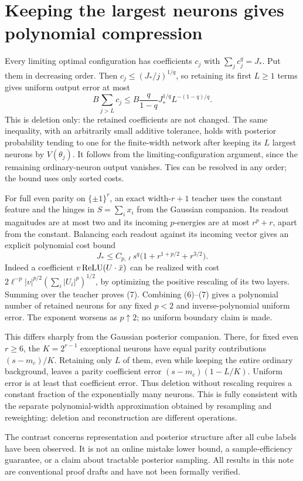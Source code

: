 \documentclass[11pt]{article}
\begin{document}
\section{Keeping the largest neurons gives polynomial compression}
Every limiting optimal configuration has coefficients $c_j$ with
$\sum_j c_j^q=J_*$. Put them in decreasing order. Then
$c_j\le(J_*/j)^{1/q}$, so retaining its first $L\ge1$ terms gives
uniform output error at most
\[
 B\sum_{j>L}c_j
 \le B\frac{q}{1-q}J_*^{1/q}L^{-(1-q)/q}.                \tag{6}
\]
This is deletion only: the retained coefficients are not changed.
The same inequality, with an arbitrarily small additive tolerance,
holds with posterior probability tending to one for the finite-width
network after keeping its $L$ largest neurons by $V(\theta_j)$.
It follows from the limiting-configuration argument, since the remaining
ordinary-neuron output vanishes. Ties can be resolved in any order;
the bound uses only sorted costs.

For full even parity on $\{\pm1\}^r$, an exact width-$r+1$ teacher
uses the constant feature and the hinges in $S=\sum_i x_i$ from the
Gaussian companion. Its readout magnitudes are at most two and its
incoming $p$-energies are at most $r^p+r$, apart from the constant.
Balancing each readout against its incoming vector gives an explicit
polynomial cost bound
\[
 J_*\le C_{p,\ell}s^q\bigl(1+r^{1+p/2}+r^{3/2}\bigr).    \tag{7}
\]
Indeed a coefficient $v\operatorname{ReLU}(U\cdot\bar x)$ can be realized with
cost $2\ell^{-p}|v|^{p/2}(\sum_i|U_i|^p)^{1/2}$, by optimizing the
positive rescaling of its two layers. Summing over the teacher proves
(7). Combining (6)--(7) gives a polynomial number of retained neurons
for any fixed $p<2$ and inverse-polynomial uniform error.
The exponent worsens as $p\uparrow2$; no uniform boundary claim is made.

This differs sharply from the Gaussian posterior companion. There,
for fixed even $r\ge6$, the $K=2^{r-1}$ exceptional neurons have equal
parity contributions $(s-m_c)/K$. Retaining only $L$ of them, even
while keeping the entire ordinary background, leaves a parity
coefficient error $(s-m_c)(1-L/K)$. Uniform error is at least that
coefficient error. Thus deletion without rescaling requires a constant
fraction of the exponentially many neurons. This is fully consistent
with the separate polynomial-width approximation obtained by resampling
and reweighting: deletion and reconstruction are different operations.

The contrast concerns representation and posterior structure after all
cube labels have been observed. It is not an online mistake lower bound,
a sample-efficiency guarantee, or a claim about tractable posterior
sampling. All results in this note are conventional proof drafts and
have not been formally verified.
\end{document}
